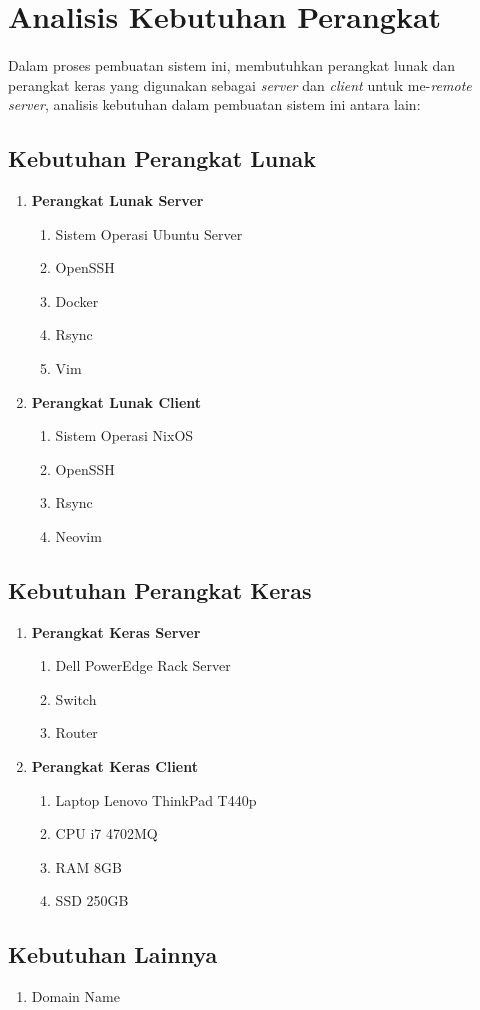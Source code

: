 \documentclass[./bab_3.tex]{subfiles}
\begin{document}
  \section{Analisis Kebutuhan Perangkat}
  \paragraph*{}Dalam proses pembuatan sistem ini, membutuhkan
  perangkat lunak dan perangkat keras yang digunakan
  sebagai \textit{server} dan \textit{client} untuk
  me-\textit{remote} \textit{server}, analisis kebutuhan dalam
  pembuatan sistem ini antara lain:
  
  \subsection{Kebutuhan Perangkat Lunak}
  \begin{enumerate}
    \item \textbf{Perangkat Lunak Server}
      \begin{enumerate}
        \item Sistem Operasi Ubuntu Server
        \item OpenSSH
        \item Docker
        \item Rsync
        \item Vim
      \end{enumerate}
    \item \textbf{Perangkat Lunak Client}
      \begin{enumerate}
        \item Sistem Operasi NixOS
        \item OpenSSH
        \item Rsync
        \item Neovim
      \end{enumerate}
  \end{enumerate}

  \subsection{Kebutuhan Perangkat Keras}
  \begin{enumerate}
    \item \textbf{Perangkat Keras Server}
      \begin{enumerate}
        \item Dell PowerEdge Rack Server
        \item Switch
        \item Router
      \end{enumerate}
    \item \textbf{Perangkat Keras Client}
      \begin{enumerate}
        \item Laptop Lenovo ThinkPad T440p
        \item CPU i7 4702MQ
        \item RAM 8GB
        \item SSD 250GB
      \end{enumerate}
  \end{enumerate}

  \subsection{Kebutuhan Lainnya}
  \begin{enumerate}
    \item Domain Name
  \end{enumerate}
\end{document}
